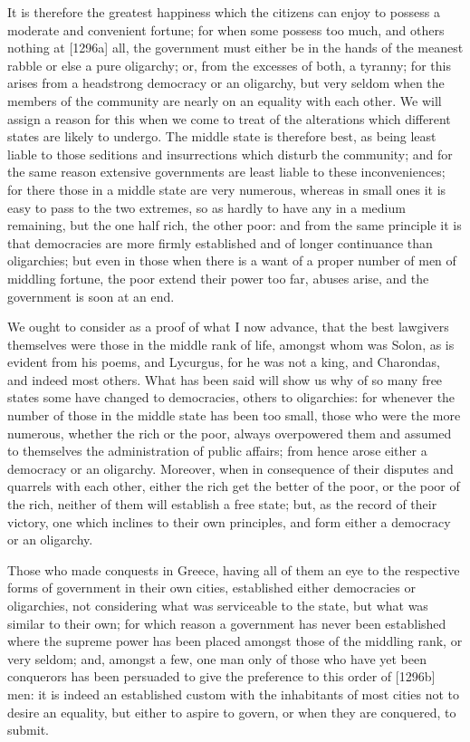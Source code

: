 It is therefore the greatest happiness which the citizens can enjoy to
possess a moderate and convenient fortune; for when some possess too much,
and others nothing at [1296a] all, the government must either be in the
hands of the meanest rabble or else a pure oligarchy; or, from the
excesses of both, a tyranny; for this arises from a headstrong democracy
or an oligarchy, but very seldom when the members of the community are
nearly on an equality with each other. We will assign a reason for this
when we come to treat of the alterations which different states are likely
to undergo. The middle state is therefore best, as being least liable to
those seditions and insurrections which disturb the community; and for the
same reason extensive governments are least liable to these
inconveniences; for there those in a middle state are very numerous,
whereas in small ones it is easy to pass to the two extremes, so as hardly
to have any in a medium remaining, but the one half rich, the other poor:
and from the same principle it is that democracies are more firmly
established and of longer continuance than oligarchies; but even in those
when there is a want of a proper number of men of middling fortune, the
poor extend their power too far, abuses arise, and the government is soon
at an end.

We ought to consider as a proof of what I now advance, that the best
lawgivers themselves were those in the middle rank of life, amongst whom
was Solon, as is evident from his poems, and Lycurgus, for he was not a
king, and Charondas, and indeed most others. What has been said will show
us why of so many free states some have changed to democracies, others to
oligarchies: for whenever the number of those in the middle state has been
too small, those who were the more numerous, whether the rich or the poor,
always overpowered them and assumed to themselves the administration of
public affairs; from hence arose either a democracy or an oligarchy.
Moreover, when in consequence of their disputes and quarrels with each
other, either the rich get the better of the poor, or the poor of the
rich, neither of them will establish a free state; but, as the record of
their victory, one which inclines to their own principles, and form either
a democracy or an oligarchy.

Those who made conquests in Greece, having all of them an eye to the
respective forms of government in their own cities, established either
democracies or oligarchies, not considering what was serviceable to the
state, but what was similar to their own; for which reason a government
has never been established where the supreme power has been placed amongst
those of the middling rank, or very seldom; and, amongst a few, one man
only of those who have yet been conquerors has been persuaded to give the
preference to this order of [1296b] men: it is indeed an established
custom with the inhabitants of most cities not to desire an equality, but
either to aspire to govern, or when they are conquered, to submit.

